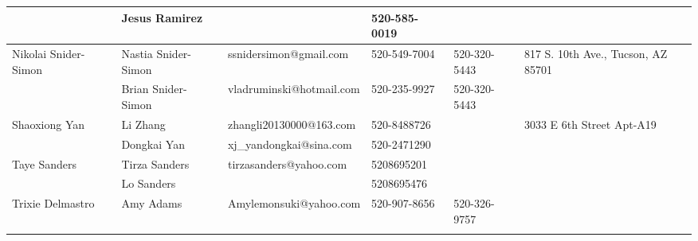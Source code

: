 \documentclass[landscape]{article}\usepackage[]{graphicx}\usepackage[]{color}
\begin{document}
\begin{longtable}{|p{100pt}|p{100pt}|p{140pt}|p{60pt}|p{64pt}|p{120pt}|}
 & Jesus Ramirez &  & 520-585-0019 &  & \\
\hline
\multirow{2}{100pt}{Nikolai Snider-Simon} & Nastia Snider-Simon & ssnidersimon@gmail.com & 520-549-7004 & 520-320-5443 & \multirow{2}{120pt}{817 S. 10th Ave., Tucson, AZ 85701} \\
 & Brian Snider-Simon & vladruminski@hotmail.com & 520-235-9927 & 520-320-5443 & \\
\hline
\multirow{2}{100pt}{Shaoxiong Yan} & Li Zhang & zhangli20130000@163.com & 520-8488726 &  & \multirow{2}{120pt}{3033 E 6th Street Apt-A19} \\
 & Dongkai Yan & xj\_yandongkai@sina.com & 520-2471290 &  & \\
\hline
\multirow{2}{100pt}{Taye Sanders} & Tirza Sanders & tirzasanders@yahoo.com & 5208695201 &  & \multirow{2}{120pt}{} \\
 & Lo Sanders &  & 5208695476 &  & \\
\hline
\multirow{2}{100pt}{Trixie Delmastro} & Amy Adams & Amylemonsuki@yahoo.com & 520-907-8656 & 520-326-9757 & \multirow{2}{120pt}{} \\
 &  &  &  &  & \\
\hline
\end{longtable}
\newpage
\end{document}
